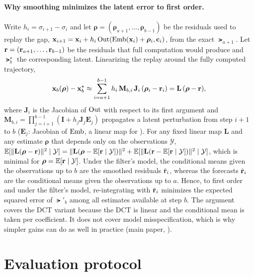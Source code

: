 \paragraph{Why smoothing minimizes the latent error to first order.}
Write $h_i=\sigma_{i+1}-\sigma_i$ and let $\boldsymbol\rho=(\boldsymbol\rho_{a+1},\dots,\boldsymbol\rho_{b-1})$ be the
residuals used to replay the gap, $\mathbf{x}_{i+1}=\mathbf{x}_i+h_i\operatorname{Out}(\operatorname{Emb}(\mathbf{x}_i)+\boldsymbol\rho_i,\mathbf{c}_i)$, from the exact
$\lat_{a+1}$. Let $\mathbf{r}=(\mathbf{r}_{a+1},\dots,\mathbf{r}_{b-1})$ be the residuals that full computation would produce and
$\lat^\star_b$ the corresponding latent. Linearizing the replay around the fully computed trajectory,
\begin{equation}
  \mathbf{x}_b(\boldsymbol\rho)-\mathbf{x}^\star_b\approx\sum_{i=a+1}^{b-1}h_i\,\mathbf M_{b,i}\,\mathbf J_i\,(\boldsymbol\rho_i-\mathbf{r}_i)
  =\mathbf L\,(\boldsymbol\rho-\mathbf{r}),
  \label{eq:supp-linear}
\end{equation}
where $\mathbf J_i$ is the Jacobian of $\operatorname{Out}$ with respect to its first argument and
$\mathbf M_{b,i}=\prod_{j=i+1}^{b-1}(\mathbf I+h_j\mathbf J_j\mathbf E_j)$ propagates a latent perturbation from step
$i+1$ to $b$ ($\mathbf E_j$: Jacobian of $\operatorname{Emb}$, a linear map for \flux). For any fixed linear map $\mathbf L$ and any
estimate $\boldsymbol\rho$ that depends only on the observations $\mathcal Y$,
$\mathbb{E}[\|\mathbf L(\boldsymbol\rho-\mathbf{r})\|^2\mid\mathcal Y]=\|\mathbf L(\boldsymbol\rho-\mathbb{E}[\mathbf{r}\mid\mathcal Y])\|^2+
\mathbb{E}[\|\mathbf L(\mathbf{r}-\mathbb{E}[\mathbf{r}\mid\mathcal Y])\|^2\mid\mathcal Y]$, which is minimal for
$\boldsymbol\rho=\mathbb{E}[\mathbf{r}\mid\mathcal Y]$. Under the filter's model, the conditional means given the observations up to
$b$ are the smoothed residuals $\tilde{\mathbf{r}}_i$, whereas the forecasts $\hat{\mathbf{r}}_i$ are the conditional means given the
observations up to $a$. Hence, to first order and under the filter's model, re-integrating with $\tilde{\mathbf{r}}_i$ minimizes the
expected squared error of $\lat'_b$ among all estimates available at step $b$. The argument covers the DCT variant
because the DCT is linear and the conditional mean is taken per coefficient. It does not cover model misspecification,
which is why simpler gains can do as well in practice (main paper, ).

\section{Evaluation protocol}
\label{supp:protocol}

